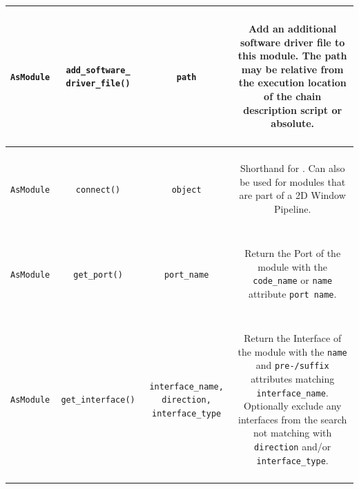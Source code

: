\begin{longtable}[htbp]{|c|c|c|c|}

\parbox{2.5cm}{~\\ \texttt{AsModule}\\~} & \parbox{3cm}{~\\ \texttt{add\_software\_ driver\_file()}\\~} & \parbox{3cm}{~ \\ \texttt{path} \\ ~} & \parbox{6cm}{~\\ Add an additional software driver file to this module. The path may be relative from the execution location of the chain description script or absolute. \\~}\\
\hline
\parbox{2.5cm}{~\\ \texttt{AsModule}\\~} & \parbox{3cm}{~\\ \texttt{connect()}\\~} & \parbox{3cm}{~ \\ \texttt{object} \\ ~} & \parbox{6cm}{~\\ Shorthand for . Can also be used for modules that are part of a 2D Window Pipeline. \\~}\\
\hline
\parbox{2.5cm}{~\\ \texttt{AsModule}\\~} & \parbox{3cm}{~\\ \texttt{get\_port()}\\~} & \parbox{3cm}{~ \\ \texttt{port\_name} \\ ~} & \parbox{6cm}{~\\ Return the Port of the module with the \texttt{code\_name} or \texttt{name} attribute \texttt{port name}. \\~}\\
\hline
\parbox{2.5cm}{~\\ \texttt{AsModule}\\~} & \parbox{3cm}{~\\ \texttt{get\_interface()}\\~} & \parbox{3cm}{~ \\ \texttt{interface\_name, direction, interface\_type} \\ ~} & \parbox{6cm}{~\\ Return the Interface of the module with the \texttt{name} and \texttt{pre-/suffix} attributes matching \texttt{interface\_name}. Optionally exclude any interfaces from the search not matching with \texttt{direction} and/or \texttt{interface\_type}. \\~}\\

\end{longtable}
